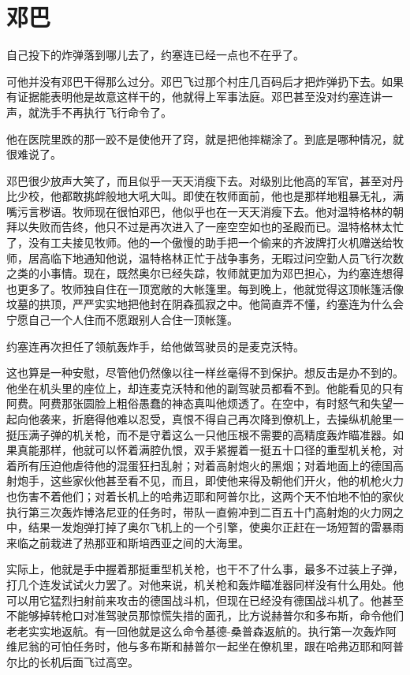 \chapter{邓巴}
 
    自己投下的炸弹落到哪儿去了，约塞连已经一点也不在乎了。

    可他并没有邓巴干得那么过分。邓巴飞过那个村庄几百码后才把炸弹扔下去。如果有证据能表明他是故意这样干的，他就得上军事法庭。邓巴甚至没对约塞连讲一声，就洗手不再执行飞行命令了。

    他在医院里跌的那一跤不是使他开了窍，就是把他摔糊涂了。到底是哪种情况，就很难说了。

    邓巴很少放声大笑了，而且似乎一天天消瘦下去。对级别比他高的军官，甚至对丹比少校，他都敢挑衅般地大吼大叫。即使在牧师面前，他也是那样地粗暴无礼，满嘴污言秽语。牧师现在很怕邓巴，他似乎也在一天天消瘦下去。他对温特格林的朝拜以失败而告终，他只不过是再次进入了一座空空如也的圣殿而已。温特格林太忙了，没有工夫接见牧师。他的一个傲慢的助手把一个偷来的齐波牌打火机赠送给牧师，居高临下地通知他说，温特格林正忙于战争事务，无暇过问空勤人员飞行次数之类的小事情。现在，既然奥尔已经失踪，牧师就更加为邓巴担心，为约塞连想得也更多了。牧师独自住在一顶宽敞的大帐篷里。每到晚上，他就觉得这顶帐篷活像坟墓的拱顶，严严实实地把他封在阴森孤寂之中。他简直弄不懂，约塞连为什么会宁愿自己一个人住而不愿跟别人合住一顶帐篷。

    约塞连再次担任了领航轰炸手，给他做驾驶员的是麦克沃特。

    这也算是一种安慰，尽管他仍然像以往一样丝毫得不到保护。想反击是办不到的。他坐在机头里的座位上，却连麦克沃特和他的副驾驶员都看不到。他能看见的只有阿费。阿费那张圆脸上粗俗愚蠢的神态真叫他烦透了。在空中，有时怒气和失望一起向他袭来，折磨得他难以忍受，真恨不得自己再次降到僚机上，去操纵机舱里一挺压满子弹的机关枪，而不是守着这么一只他压根不需要的高精度轰炸瞄准器。如果真能那样，他就可以怀着满腔仇恨，双手紧握着一挺五十口径的重型机关枪，对着所有压迫他虐待他的混蛋狂扫乱射；对着高射炮火的黑烟；对着地面上的德国高射炮手，这些家伙他甚至看不见，而且，即使他来得及朝他们开火，他的机枪火力也伤害不着他们；对着长机上的哈弗迈耶和阿普尔比，这两个天不怕地不怕的家伙执行第三次轰炸博洛尼亚的任务时，带队一直俯冲到二百五十门高射炮的火力网之中，结果一发炮弹打掉了奥尔飞机上的一个引擎，使奥尔正赶在一场短暂的雷暴雨来临之前栽进了热那亚和斯培西亚之间的大海里。

    实际上，他就是手中握着那挺重型机关枪，也干不了什么事，最多不过装上子弹，打几个连发试试火力罢了。对他来说，机关枪和轰炸瞄准器同样没有什么用处。他可以用它猛烈扫射前来攻击的德国战斗机，但现在已经没有德国战斗机了。他甚至不能够掉转枪口对准驾驶员那惊慌失措的面孔，比方说赫普尔和多布斯，命令他们老老实实地返航。有一回他就是这么命令基德-桑普森返航的。执行第一次轰炸阿维尼翁的可怕任务时，他与多布斯和赫普尔一起坐在僚机里，跟在哈弗迈耶和阿普尔比的长机后面飞过高空。

